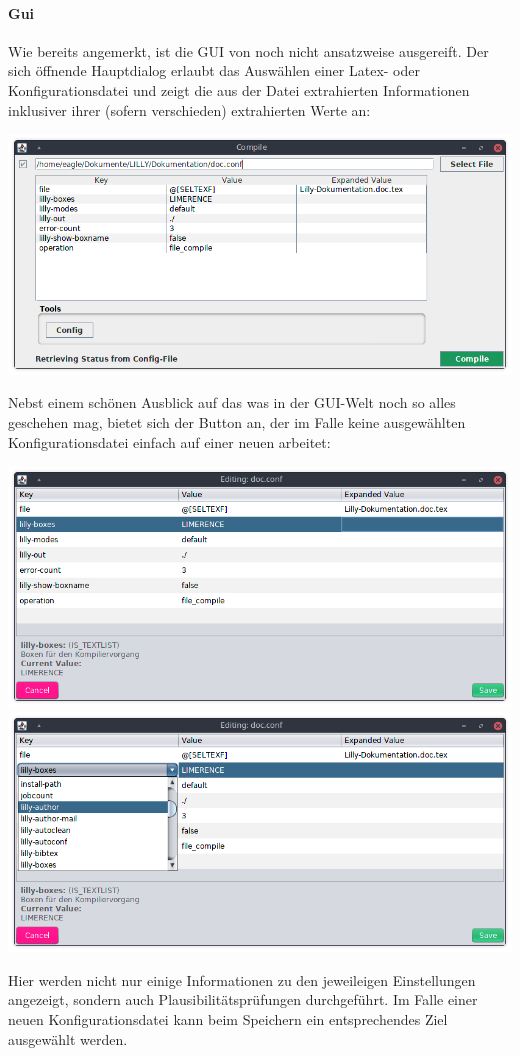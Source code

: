 \paragraph{Gui}
Wie bereits angemerkt, ist die GUI von \Jake noch nicht ansatzweise ausgereift. Der sich öffnende Hauptdialog erlaubt das Auswählen einer Latex- oder Konfigurationsdatei und zeigt die aus der Datei extrahierten Informationen inklusiver ihrer (sofern verschieden) extrahierten Werte an:
\begin{center}
    \includegraphics[width=0.75\linewidth]{Data/Bilder/JakeGUIMain.png}
\end{center}
Nebst einem schönen Ausblick auf das was in der GUI-Welt noch so alles geschehen mag, bietet sich der Button  an, der im Falle keine ausgewählten Konfigurationsdatei einfach auf einer neuen arbeitet:
\begin{center}
    \includegraphics[width=0.5\linewidth]{Data/Bilder/JakeGUIConfig.png}\includegraphics[width=0.5\linewidth]{Data/Bilder/JakeGUIConfigSelection.png}    
\end{center}
Hier werden nicht nur einige Informationen zu den jeweileigen Einstellungen angezeigt, sondern auch Plausibilitätsprüfungen durchgeführt. Im Falle einer neuen Konfigurationsdatei kann beim Speichern ein entsprechendes Ziel ausgewählt werden. 

